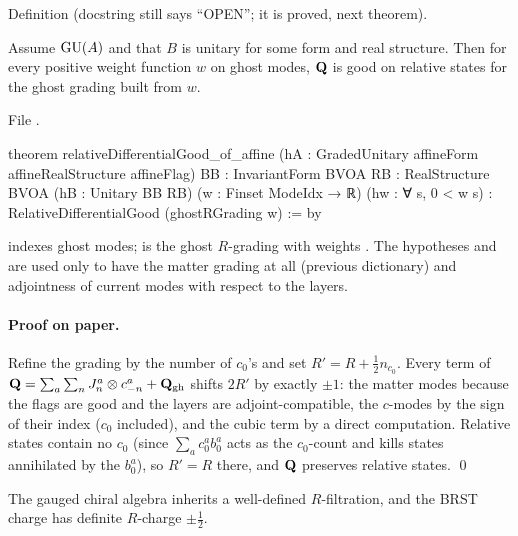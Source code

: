 \begin{status}
Definition (docstring still says ``OPEN''; it is proved, next theorem).
\end{status}

\begin{theorem}\label{l28:thm:good}
Assume $\mathrm{GU}(A)$ and that $B$ is unitary for some form and real structure. Then for every positive weight function $w$ on ghost modes,
$\mathbf Q$ is good on relative states for the ghost grading built from $w$.
\end{theorem}

\noindent File .
\begin{leancode}
theorem relativeDifferentialGood_of_affine
    (hA : GradedUnitary affineForm affineRealStructure affineFlag)
    {BB : InvariantForm BVOA} {RB : RealStructure BVOA} (hB : Unitary BB RB)
    (w : Finset ModeIdx → ℝ) (hw : ∀ s, 0 < w s) :
    RelativeDifferentialGood (ghostRGrading w) := by
\end{leancode}

\begin{dictionary}
 indexes ghost modes;  is the ghost $R$-grading with weights . The hypotheses  and 
are used only to have the matter grading at all (previous dictionary) and adjointness of current modes with respect to the layers.
\end{dictionary}

\paragraph{Proof on paper.} Refine the grading by the number of $c_0$'s and set $R'=R+\tfrac12n_{c_0}$. Every term of
$\mathbf Q=\sum_a\sum_nJ^a_n\otimes c^a_{-n}+\mathbf Q_{\mathrm{gh}}$ shifts $2R'$ by exactly $\pm1$: the matter modes because the flags
are good and the layers are adjoint-compatible, the $c$-modes by the sign of their index ($c_0$ included), and the cubic term by a direct
computation. Relative states contain no $c_0$ (since $\sum_ac_0^ab_0^a$ acts as the $c_0$-count and kills states annihilated by the $b^a_0$), so
$R'=R$ there, and $\mathbf Q$ preserves relative states. \qed

\begin{physics}
The gauged chiral algebra inherits a well-defined $R$-filtration, and the BRST charge has definite $R$-charge $\pm\tfrac12$.
\end{physics}

